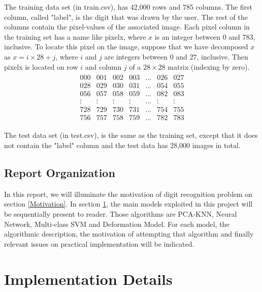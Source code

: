\documentclass{article} %
\begin{document}
The training data set (in train.csv), has 42,000 rows and 785 columns. The first column, called
"label", is the digit that was drawn by the user. The rest of the columns
contain the pixel-values of the associated image.  Each pixel column in the
training set has a name like pixelx, where $x$ is an integer between 0 and
783, inclusive. To locate this pixel on the image, suppose that we have
decomposed $x$ as $x = i \times 28 + j$, where $i$ and $j$ are integers
between 0 and 27, inclusive. Then pixelx is located on row $i$ and column $j$
of a $28 \times 28$ matrix (indexing by zero).  
\begin{align}
\begin{matrix}
000 & 001 & 002 & 003 & \dots & 026 & 027 \\
028 & 029 & 030 & 031 & \dots & 054 & 055 \\
056 & 057 & 058 & 059 & \dots & 082 & 083 \\
\vdots  & \vdots & \vdots    & \vdots   & \dots & \vdots  & \vdots  \\
728 & 729 & 730 & 731 & \dots & 754 & 755 \\
756 & 757 & 758 & 759 & \dots & 782 & 783 
\end{matrix}
\end{align}

The test data set (in test.csv), is the same as the training set, except that it
does not contain the "label" column and the test data has 28,000 images in total.

\subsection{Report Organization}
In this report, we will illuminate the motivation of digit recognition
problem on section \ref{Motivation}. In section \ref{Details}, the
 main models exploited in this project will be sequentially present to
 reader. Those algorithms are PCA-KNN, Neural Network, Multi-class SVM and
 Deformation Model. For each model, the algorithmic description, the
 motivation of attempting that algorithm and finally relevant issues on
 practical implementation will be indicated. 

\section{Implementation Details} \label{Details}
\end{document}
